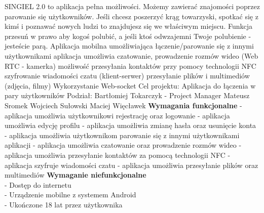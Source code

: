 \documentclass[12pt,a4paper]{article}
\begin{document}
SINGIEL 2.0 to aplikacja pełna możliwości. Możemy zawierać znajomości poprzez parowanie się użytkowników. Jeśli chcesz poszerzyć krąg towarzyski, spotkać się z kimś i poznawać nowych ludzi to znajdujesz się we właściwym miejscu. Funkcja przesuń w prawo aby kogoś polubić, a jeśli ktoś odwzajemni Twoje polubienie - jesteście parą.
\newline
\newline
Aplikacja mobilna umożliwiająca łączenie/parowanie się z innymi użytkownikami 
aplikacja umożliwia czatowanie, prowadzenie rozmów wideo (Web RTC - kamerka)
możliwość przesyłania kontaktów przy pomocy technologii NFC
szyfrowanie wiadomości czatu (klient-serwer)
przesyłanie plików i multimediów (zdjęcia, filmy)
Wykorzystanie Web-socket
\newline 
\newline 
Cel projektu:
\newline
\newline
Aplikacja do łączenia w pary użytkowników
\newline
\newline Podział:
\newline
\newline Bartłomiej Tokarczyk - Project Manager
\newline Mateusz Sromek
\newline Wojciech Sułowski
\newline Maciej Więcławek
\newline 
\newline\textbf{ Wymagania funkcjonalne}
\newline
\newline - aplikacja umożliwia użytkownikowi rejestrację oraz logowanie
\newline - aplikacja umożliwia edycję profilu 
\newline - aplikacja umożliwia zmianę hasła oraz usunięcie konta 
\newline - aplikacja umożliwia użytkownikom parowanie się z innymi użytkownikami aplikacji 
\newline - aplikacja umożliwia czatowanie oraz prowadzenie rozmów wideo 
\newline - aplikacja umożliwia przesyłanie kontaktów za pomocą technologii NFC
\newline - aplikacja szyfruje wiadomości czatu
\newline - aplikacja umożliwia przesyłanie plików oraz multimediów
\newline
\newline
\newline
\textbf{Wymaganie niefunkcjonalne }
\\ - Dostęp do internetu
\\ - Urządzenie mobilne z systemem Android 
\\ - Ukończone 18 lat przez użytkownika
\end{document}
